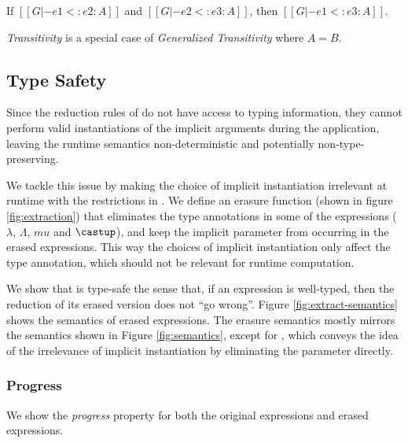 \begin{corollary}[Transitivity]
    If $[[G |- e1 <: e2 : A]]$ and $[[G |- e2 <: e3 : A]]$,
    then $[[G |- e1 <: e3 : A]]$.
\end{corollary}

\emph{Transitivity} is a special case of
\emph{Generalized Transitivity} where $A = B$.

\subsection{Type Safety}
\label{sec:type-safety}

Since the reduction rules of \name do not have access to typing information, they
cannot perform valid instantiations of the implicit arguments during the application,
leaving the runtime semantics non-deterministic and potentially non-type-preserving.

We tackle this issue by making the choice of implicit instantiation
irrelevant at runtime with the restrictions in .
We define an erasure function (shown in figure \ref{fig:extraction})
that eliminates the type annotations
in some of the expressions ($\lambda$, $\Lambda$, $mu$ and $\castup$),
and keep the implicit parameter from occurring in the erased expressions.
This way the choices of implicit instantiation only affect the type annotation,
which should not be relevant for runtime computation.

We show that \name is type-safe the sense that,
if an expression is well-typed, then the reduction of its erased version
does not ``go wrong''. Figure \ref{fig:extract-semantics} shows the semantics of
erased expressions. The erasure semantics mostly mirrors the semantics
shown in Figure \ref{fig:semantics}, except for , which
conveys the idea of the irrelevance of implicit instantiation by eliminating the
parameter directly.

\subsubsection{Progress} We show the \emph{progress} property for both the original expressions
and erased expressions.

